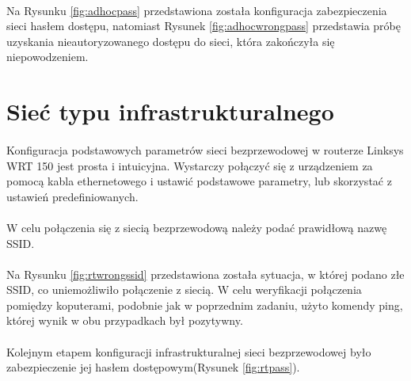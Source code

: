 \documentclass[wide,a4paper,titlepage,12pt] {article}
\begin{document}

\paragraph{} %
\label{par:}
Na Rysunku \ref{fig:adhocpass} przedstawiona została konfiguracja zabezpieczenia sieci hasłem dostępu, natomiast Rysunek \ref{fig:adhocwrongpass} przedstawia próbę uzyskania nieautoryzowanego dostępu do sieci, która zakończyła się niepowodzeniem.

\section{Sieć typu infrastrukturalnego} %
\paragraph{} %
Konfiguracja podstawowych parametrów sieci bezprzewodowej w routerze Linksys WRT 150 jest prosta i intuicyjna. Wystarczy połączyć się z urządzeniem za pomocą kabla ethernetowego i ustawić podstawowe parametry, lub skorzystać z ustawień predefiniowanych.

\paragraph{}
W celu połączenia się z siecią bezprzewodową należy podać prawidłową nazwę SSID.


\paragraph{} %
\label{par:}
Na Rysunku \ref{fig:rtwrongssid} przedstawiona została sytuacja, w której podano złe SSID, co uniemożliwiło połączenie z siecią. W celu weryfikacji połączenia pomiędzy koputerami, podobnie jak w poprzednim zadaniu, użyto komendy ping, której wynik w obu przypadkach był pozytywny.

\paragraph{} %
\label{par:}
Kolejnym etapem konfiguracji infrastrukturalnej sieci bezprzewodowej było zabezpieczenie jej hasłem dostępowym(Rysunek \ref{fig:rtpass}).
\end{document}
